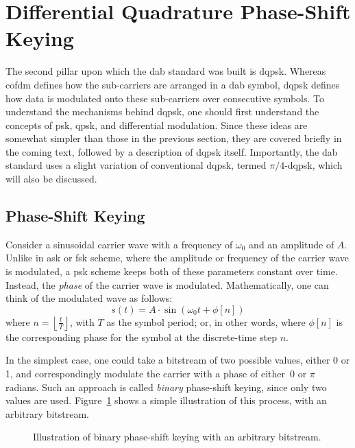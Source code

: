 \documentclass[class=report,11pt,crop=false]{standalone}
\begin{document}
\section{Differential Quadrature Phase-Shift Keying \label{sect:dab-std_psk}}
The second pillar upon which the \gls{dab} standard was built is \gls{dqpsk}. Whereas \gls{cofdm} defines how the sub-carriers are arranged in a \gls{dab} symbol, \gls{dqpsk} defines how data is modulated onto these sub-carriers over consecutive symbols. To understand the mechanisms behind \gls{dqpsk}, one should first understand the concepts of \gls{psk}, \gls{qpsk}, and differential modulation. Since these ideas are somewhat simpler than those in the previous section, they are covered briefly in the coming text, followed by a description of \gls{dqpsk} itself. Importantly, the \gls{dab} standard uses a slight variation of conventional \gls{dqpsk}, termed \(\pi/4\)-\gls{dqpsk}, which will also be discussed.

\subsection{Phase-Shift Keying}
Consider a sinusoidal carrier wave with a frequency of \(\omega_0\) and an amplitude of \(A\). Unlike in \gls{ask} or \gls{fsk} scheme, where the amplitude or frequency of the carrier wave is modulated, a \gls{psk} scheme keeps both of these parameters constant over time. Instead, the \emph{phase} of the carrier wave is modulated. Mathematically, one can think of the modulated wave as follows:
\begin{equation}
    s(t) = A \cdot \sin(\omega_0t + \phi[n])
\end{equation}
where \(n=\left\lfloor \frac{t}{T} \right\rfloor\), with \(T\) as the symbol period; or, in other words, where \(\phi[n]\) is the corresponding phase for the symbol at the discrete-time step \(n\).

In the simplest case, one could take a bitstream of two possible values, either 0 or 1, and correspondingly modulate the carrier with a phase of either~\(0\) or \(\pi\) radians. Such an approach is called \emph{binary} phase-shift keying, since only two values are used. Figure~\ref{fig:binary-psk} shows a simple illustration of this process, with an arbitrary bitstream.

\begin{figure}[htbp]
    \centering
    \captionsetup{type=figure}
    \def\svgwidth{1\linewidth}
    {\scriptsize
        }
    \caption{Illustration of binary phase-shift keying with an arbitrary bitstream.}
    \label{fig:binary-psk}
\end{figure}
\end{document}
